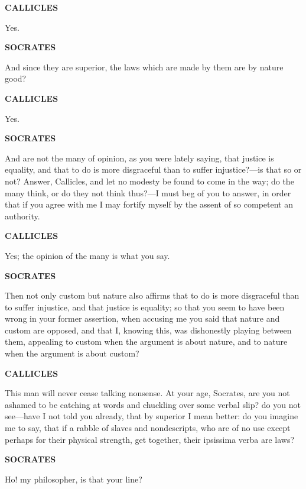 \documentclass[11pt,letter]{article}
\begin{document}
\par \textbf{CALLICLES}
\par   Yes.

\par \textbf{SOCRATES}
\par   And since they are superior, the laws which are made by them are by nature good?

\par \textbf{CALLICLES}
\par   Yes.

\par \textbf{SOCRATES}
\par   And are not the many of opinion, as you were lately saying, that justice is equality, and that to do is more disgraceful than to suffer injustice?—is that so or not? Answer, Callicles, and let no modesty be found to come in the way; do the many think, or do they not think thus?—I must beg of you to answer, in order that if you agree with me I may fortify myself by the assent of so competent an authority.

\par \textbf{CALLICLES}
\par   Yes; the opinion of the many is what you say.

\par \textbf{SOCRATES}
\par   Then not only custom but nature also affirms that to do is more disgraceful than to suffer injustice, and that justice is equality; so that you seem to have been wrong in your former assertion, when accusing me you said that nature and custom are opposed, and that I, knowing this, was dishonestly playing between them, appealing to custom when the argument is about nature, and to nature when the argument is about custom?

\par \textbf{CALLICLES}
\par   This man will never cease talking nonsense. At your age, Socrates, are you not ashamed to be catching at words and chuckling over some verbal slip? do you not see—have I not told you already, that by superior I mean better:  do you imagine me to say, that if a rabble of slaves and nondescripts, who are of no use except perhaps for their physical strength, get together, their ipsissima verba are laws?

\par \textbf{SOCRATES}
\par   Ho! my philosopher, is that your line?
\end{document}
